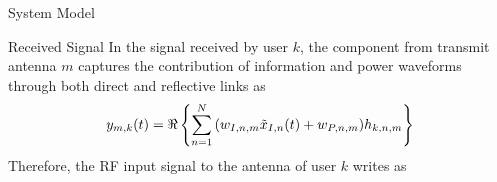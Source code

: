 \documentclass{IEEEtran}
\begin{document}
\begin{section} {System Model}
	\begin{subsection} {Received Signal}
		In the signal received by user $k$, the component from transmit antenna $m$ captures the contribution of information and power waveforms through both direct and reflective links as
		\begin{equation} \label{eq:y_{m,k}(t)}
			y_{m,k}(t)=\Re\left\{\sum_{n=1}^N{(w_{I,n,m}\tilde{x}_{I,n}(t)+w_{P,n,m})h_{k,n,m}}\right\}
		\end{equation}
		Therefore, the RF input signal to the antenna of user $k$ writes as

	\end{subsection}
\end{section}



\end{document}
